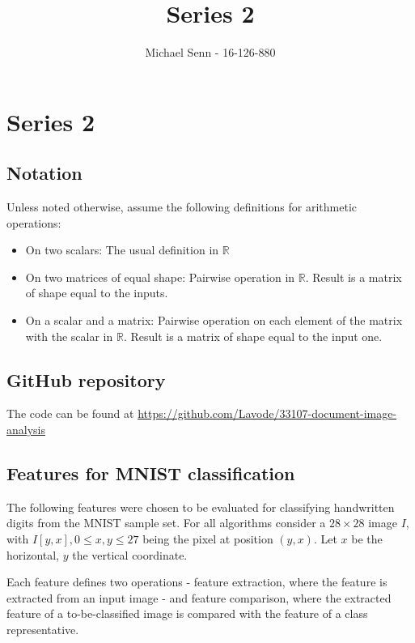 \documentclass[a4paper]{scrreprt}
\title{Series 2}
\author{Michael Senn \maillink{michael.senn@students.unibe.ch} - 16-126-880}
\date{\printdate}
\begin{document}
\maketitle


\setcounter{chapter}{1}

\chapter{Series 2}

\section{Notation}

Unless noted otherwise, assume the following definitions for arithmetic operations:
\begin{itemize}
		\item On two scalars: The usual definition in $\mathbb{R}$
		\item On two matrices of equal shape: Pairwise operation in $\mathbb{R}$.
				Result is a matrix of shape equal to the inputs.
		\item On a scalar and a matrix: Pairwise operation on each element of the
				matrix with the scalar in $\mathbb{R}$. Result is a matrix of
				shape equal to the input one.
\end{itemize}

\section{GitHub repository}

The code can be found at \url{https://github.com/Lavode/33107-document-image-analysis}

\section{Features for MNIST classification}

The following features were chosen to be evaluated for classifying handwritten
digits from the MNIST sample set. For all algorithms consider a $28 \times 28$
image $I$, with $I[y, x], 0 \leq x, y \leq 27$ being the pixel at position $(y,
x)$. Let $x$ be the horizontal, $y$ the vertical coordinate.

Each feature defines two operations - feature extraction, where the feature is
extracted from an input image - and feature comparison, where the extracted
feature of a to-be-classified image is compared with the feature of a class
representative.
\end{document}
